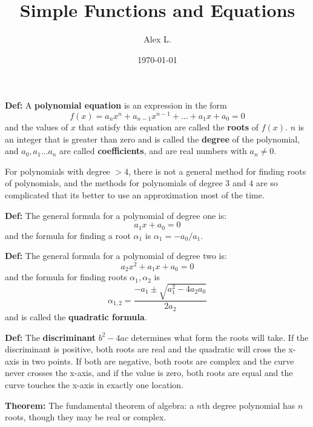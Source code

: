 \documentclass{article}
\title{Simple Functions and Equations}
\author{Alex L.}
\date{\today}
\begin{document}
\maketitle

\textbf{Def:} A \textbf{polynomial equation} is an expression in the form $$f(x) = a_nx^n + a_{n-1}x^{n-1} + ... + a_1x + a_0 = 0$$and the values of $x$ that satisfy this equation are called the \textbf{roots} of $f(x)$. $n$ is an integer that is greater than zero and is called the \textbf{degree} of the polynomial, and $a_0, a_1 ... a_n$ are called \textbf{coefficients}, and are real numbers with $a_n \neq 0$.

For polynomials with degree $>4$, there is not a general method for finding roots of polynomials, and the methods for polynomials of degree $3$ and $4$ are so complicated that its better to use an approximation most of the time.

\textbf{Def:} The general formula for a polynomial of degree one is: $$a_1x + a_0 = 0$$and the formula for finding a root $\alpha_1$ is $\alpha_1 = -a_0/a_1$.

\textbf{Def:} The general formula for a polynomial of degree two is: $$a_2x^2 + a_1x + a_0 = 0$$and the formula for finding roots $\alpha_1, \alpha_2$ is $$\alpha_{1,2} = \frac{-a_1 \pm \sqrt{a_1^2-4a_2a_0}}{2a_2}$$and is called the \textbf{quadratic formula}.

\textbf{Def:} The \textbf{discriminant} $b^2-4ac$ determines what form the roots will take. If the discriminant is positive, both roots are real and the quadratic will cross the x-axis in two points. If both are negative, both roots are complex and the curve never crosses the x-axis, and if the value is zero, both roots are equal and the curve touches the x-axis in exactly one location.

\textbf{Theorem:} The fundamental theorem of algebra: a $n$th degree polynomial has $n$ roots, though they may be real or complex. 
\end{document}
